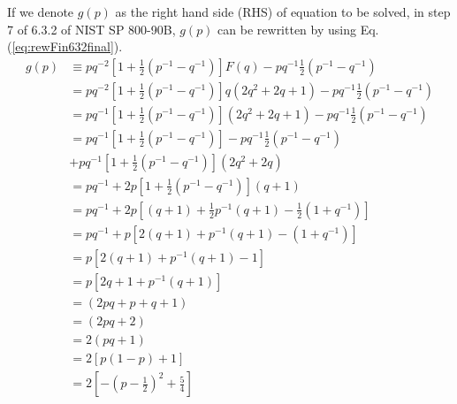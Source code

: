 ﻿\documentclass[a3paper,xelatex,english]{bxjsarticle}
\begin{document}
If we denote $g(p)$ as the right hand side (RHS) of equation to be solved, in step 7 of 6.3.2 of NIST SP 800-90B\cite{SP80090B}, $g(p)$ can be rewritten by using Eq.(\ref{eq:rewFin632final}).
\begin{align}
g(p) & \equiv  p q^{-2} \left[ 1 + \frac{1}{2}(p^{-1} - q^{-1}) \right]F(q) - p q^{-1} \frac{1}{2}(p^{-1} - q^{-1}) \nonumber \\
&= p q^{-2} \left[ 1 + \frac{1}{2}(p^{-1} - q^{-1}) \right]q \left( 2q^{2} + 2q + 1 \right) - p q^{-1} \frac{1}{2}(p^{-1} - q^{-1}) \nonumber \\
&= p q^{-1} \left[ 1 + \frac{1}{2}(p^{-1} - q^{-1}) \right]  \left( 2q^{2} + 2q + 1 \right) - p q^{-1} \frac{1}{2}(p^{-1} - q^{-1}) \nonumber \\
&= p q^{-1} \left[ 1 + \frac{1}{2}(p^{-1} - q^{-1}) \right] - p q^{-1} \frac{1}{2}(p^{-1} - q^{-1}) \nonumber \\
&+ p q^{-1} \left[ 1 + \frac{1}{2}(p^{-1} - q^{-1}) \right] \left( 2q^{2} + 2q \right) \nonumber \\
&= p q^{-1} 
 + 2 p \left[ 1 + \frac{1}{2}(p^{-1} - q^{-1}) \right] \left( q + 1 \right) \nonumber \\
&= p q^{-1} 
 + 2 p \left[ (q + 1) + \frac{1}{2}p^{-1}(q + 1) - \frac{1}{2}(1 + q^{-1}) \right] \nonumber \\
&= p q^{-1} 
 + p \left[ 2(q + 1) + p^{-1}(q + 1) - (1 + q^{-1}) \right] \nonumber \\
&= p \left[ 2(q + 1) + p^{-1}(q + 1) - 1 \right] \nonumber \\
&= p \left[ 2q + 1 + p^{-1}(q + 1) \right] \nonumber \\
&= \left( 2pq + p + q + 1 \right) \nonumber \\
&= \left( 2pq + 2 \right) \nonumber \\
&= 2( pq + 1) \nonumber \\
&= 2 \left[ p(1 - p) + 1 \right] \nonumber \\
&= 2 \left[ -\left(p - \frac{1}{2}\right)^{2} + \frac{5}{4} \right] \label{eq:rhs632}
\end{align}
\end{document}
